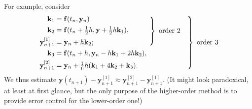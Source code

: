 \documentclass[a4paper]{article}
\begin{document}
For example, consider
\[
    \begin{rcases}
        \begin{rcases}
        \begin{aligned}
            \mathbf{k}_1 &= \mathbf{f}(t_n, \mathbf{y}_n)\\ 
            \mathbf{k}_2 &= \mathbf{f}( t_n + \tfrac{1}{2}h, \mathbf{y} + \tfrac{1}{2} h \mathbf{k}_1),\hspace*{3em}\\ 
            \mathbf{y}^{[1]}_{n+1} &= \mathbf{y}_n + h \mathbf{k}_2;
        \end{aligned}
        \end{rcases} \text{ order }2\hspace*{1em}\\
        \hspace{1.1pt}
        \begin{aligned}
            \mathbf{k}_3 &= \mathbf{f}(t_n + h, \mathbf{y}_n - h \mathbf{k}_1 + 2h \mathbf{k}_2),\\ 
            \mathbf{y}^{[2]}_{n+1} &= \mathbf{y}_n + \tfrac{1}{6} h (\mathbf{k}_1 + 4 \mathbf{k}_2 + \mathbf{k}_3).
        \end{aligned}
    \end{rcases}\text{ order }3
\]
We thus estimate $\mathbf{y}\left(t_{n+1}\right)-\mathbf{y}_{n+1}^{[1]} \approx \mathbf{y}_{n+1}^{[2]}-\mathbf{y}_{n+1}^{[1]}$. (It might look paradoxical, at least at first glance, but the only purpose of the higher-order method is to provide error control for the lower-order one!)
\end{document}
